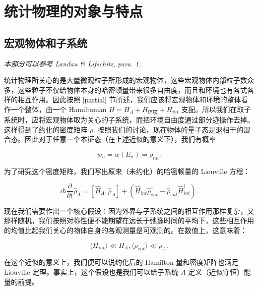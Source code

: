 \section{统计物理的对象与特点}

\subsection{宏观物体和子系统}
\noindent\textit{
本部分可以参考 {Landau \& Lifschitz, para. 1.}}

统计物理所关心的是大量微观粒子所形成的宏观物体，这些宏观物体内部粒子数众多，这些粒子不仅给物体本身的哈密顿量带来很多自由度，而且和环境也有各式各样的相互作用。因此按照 \ref{partial} 节所述，我们应该将宏观物体和环境的整体看作一个整体，由一个 Hamiltonian $H=H_{A} + H_{\text{环境}} + H_{int}$ 支配。所以我们在取子系统时，应将宏观物体取为关心的子系统，而把环境自由度通过部分迹操作去掉。这样得到了约化的密度矩阵 $\rho.$ 按照我们的讨论，现在物体的量子态是退相干的混合态。因此对于任意一个本征态（在上述近似的意义下），我们有概率\begin{linenomath}\begin{equation}w_n=w(E_n)=\rho_{nn}.\end{equation}\end{linenomath}

为了研究这个密度矩阵，我们写出原来（未约化）的哈密顿量的 Liouville 方程：
\begin{linenomath}\begin{equation}
i\hbar \frac{\partial}{\partial t} \hat{\rho}_A = \left[ \hat{H}_A,\hat{\rho}_{A} \right] + \left( \hat{H}_{int} \hat{\rho}_{ent}^\dagger - \hat{\rho}_{ent} \hat{H}_{int} ^\dagger\right).
\end{equation}\end{linenomath}
现在我们需要作出一个核心假设：因为外界与子系统之间的相互作用那样复杂，又那样随机，我们按照对称性便不能期望在远长于弛豫时间的平均下，这些相互作用的均值比起我们关心的物体自身的各观测量是可观测的。在数值上，这意味着：
\begin{linenomath}\begin{equation}\langle H_{int} \rangle \ll H_A, \langle \rho_{ent} \rangle \ll \rho_A.\end{equation}\end{linenomath}
在这个近似的意义上，我们便可以说约化后的 Hamilton 量和密度矩阵也满足 Liouville 定理。事实上，这个假设也是我们可以给子系统 $A$ 定义（近似守恒）能量的前提。

